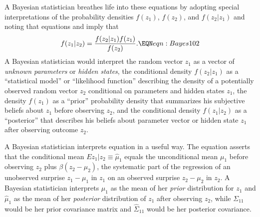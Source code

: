A Bayesian statistician breathes life into these equations %
 by adopting  special interpretations of the probability
densities $f(z_1)$, $f(z_2)$,  and $f(z_2|z_1)$ and noting that equations  and 
imply that
$$ f(z_1 | z_2) =  {\frac{f(z_2|z_1) f(z_1)}{f(z_2)} } . \EQN eqn:Bayes102 $$
A Bayesian statistician would interpret
the random vector $z_1$ as a  vector of   {\it unknown parameters} or {\it hidden states},
  the conditional density $f(z_2|z_1)$ as a ``statistical model'' or ``likelihood function'' describing
the density of a potentially observed  random vector $z_2$ conditional on parameters and hidden states $z_1$,  the density $f(z_1)$ as a ``prior''
 probability density
that summarizes his subjective
beliefs about $z_1$ before observing $z_2$, and  the conditional
density $f(z_1| z_2)$ as a ``posterior'' that describes his beliefs about  parameter vector or hidden state $z_1$ after observing outcome
$z_2$.
%
%
%
%

A Bayesian statistician interprets equation  in a useful way. The equation
 asserts that the conditional mean $E z_1 | z_2 \equiv \hat \mu_1$ equals the unconditional mean $\mu_1$ before observing $z_2$
plus  $\beta (z_2 - \mu_2)$, the systematic part of the regression  of an unobserved surprise $z_1 - \mu_1$ in $z_1$ on an observed surprise
$z_2 - \mu_2$ in $z_2$.
A Bayesian statistician  interprets $\mu_1$ as the mean of her {\it prior\/} distribution for $z_1$ and $\hat \mu_1$ as the mean of her
{\it posterior\/} distribution of $z_1$ after observing $z_2$, while $\Sigma_{11}$ would be her prior covariance matrix and $\hat \Sigma_{11}$ would be her
posterior covariance.

